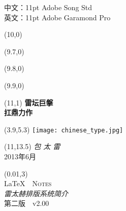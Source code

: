 
\newpage
\thispagestyle{empty}
\vspace*{\fill}
\begin{center}
中文：11pt Adobe Song Std\\
英文：11pt Adobe Garamond Pro
\end{center}
\vspace{\fill}

\begin{titlepage}

\setlength\parindent{0pt}


\begin{textblock}{6}(10,0)
    \rule{0mm}{420mm}
\end{textblock}

\begin{textblock}{.02}(9.7,0)
    \rule{0mm}{420mm}
\end{textblock}

\begin{textblock}{.02}(9.8,0)
    \rule{0mm}{420mm}
\end{textblock}

\begin{textblock}{.02}(9.9,0)
    \rule{0mm}{420mm}
\end{textblock}

\begin{textblock}{3}(11,1)
    {\Huge \textbf{雷坛巨搫}\\[5pt] \textbf{扛鼎力作}}
\end{textblock}

\begin{textblock}{12.8}(3.9,5.3)
\textblockcolour{}
    \texttt{[image: chinese\_type.jpg]}
\end{textblock}

\begin{textblock}{4}(11,13.5)
    {\huge \textit{包 太 雷}}\\[5pt]
    {\Large 2013年6月}
\end{textblock}

\TPshowboxestrue
\setlength\TPboxrulesize{0.8pt}

\begin{textblock}{14}(0.01,3)
    \centering
    ~\\[20pt]
    {\fontsize{32}{40}\selectfont \LaTeX\ \ \textsc{Notes}}\\[8pt]
    {\huge \textit{雷太赫排版系统简介}}\\[8pt]
    第二版\ \ v2.00\\[20pt]
\end{textblock}
~
\end{titlepage}
